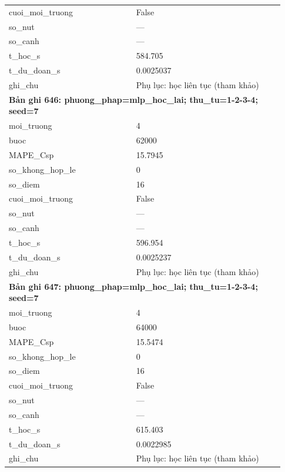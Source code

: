 \begin{longtable}{p{0.43\linewidth}p{0.50\linewidth}}
cuoi\_\allowbreak moi\_\allowbreak truong & False \\
so\_\allowbreak nut & — \\
so\_\allowbreak canh & — \\
t\_\allowbreak hoc\_\allowbreak s & 584.705 \\
t\_\allowbreak du\_\allowbreak doan\_\allowbreak s & 0.0025037 \\
ghi\_\allowbreak chu & Phụ lục: học liên tục (tham khảo) \\
\midrule
\multicolumn{2}{p{0.95\linewidth}}{\textbf{Bản ghi 646: phuong\_phap=mlp\_hoc\_lai; thu\_tu=1-2-3-4; seed=7}} \\
moi\_\allowbreak truong & 4 \\
buoc & 62000 \\
MAPE\_\allowbreak Csp & 15.7945 \\
so\_\allowbreak khong\_\allowbreak hop\_\allowbreak le & 0 \\
so\_\allowbreak diem & 16 \\
cuoi\_\allowbreak moi\_\allowbreak truong & False \\
so\_\allowbreak nut & — \\
so\_\allowbreak canh & — \\
t\_\allowbreak hoc\_\allowbreak s & 596.954 \\
t\_\allowbreak du\_\allowbreak doan\_\allowbreak s & 0.0025237 \\
ghi\_\allowbreak chu & Phụ lục: học liên tục (tham khảo) \\
\midrule
\multicolumn{2}{p{0.95\linewidth}}{\textbf{Bản ghi 647: phuong\_phap=mlp\_hoc\_lai; thu\_tu=1-2-3-4; seed=7}} \\
moi\_\allowbreak truong & 4 \\
buoc & 64000 \\
MAPE\_\allowbreak Csp & 15.5474 \\
so\_\allowbreak khong\_\allowbreak hop\_\allowbreak le & 0 \\
so\_\allowbreak diem & 16 \\
cuoi\_\allowbreak moi\_\allowbreak truong & False \\
so\_\allowbreak nut & — \\
so\_\allowbreak canh & — \\
t\_\allowbreak hoc\_\allowbreak s & 615.403 \\
t\_\allowbreak du\_\allowbreak doan\_\allowbreak s & 0.0022985 \\
ghi\_\allowbreak chu & Phụ lục: học liên tục (tham khảo) \\

\end{longtable}
